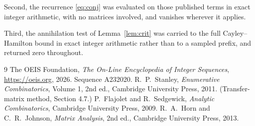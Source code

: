 \documentclass[11pt,a4paper]{article}
\theoremstyle{plain}
\theoremstyle{definition}
\begin{document}
Second, the recurrence \eqref{eq:conj} was evaluated on those published terms in exact
integer arithmetic, with no matrices involved, and vanishes wherever it applies.

Third, the annihilation test of Lemma~\ref{lem:crit} was carried to the full
Cayley--Hamilton bound in exact integer arithmetic rather than to a sampled prefix, and
returned zero throughout.

\begin{thebibliography}{9}
 The OEIS Foundation, \emph{The On-Line Encyclopedia of Integer
Sequences}, \url{https://oeis.org}, 2026. Sequence A232020.
 R.~P.~Stanley, \emph{Enumerative Combinatorics}, Volume 1, 2nd ed.,
Cambridge University Press, 2011. (Transfer-matrix method, Section 4.7.)
 P.~Flajolet and R.~Sedgewick, \emph{Analytic Combinatorics}, Cambridge
University Press, 2009.
 R.~A.~Horn and C.~R.~Johnson, \emph{Matrix Analysis}, 2nd ed., Cambridge
University Press, 2013.
\end{thebibliography}
\end{document}
